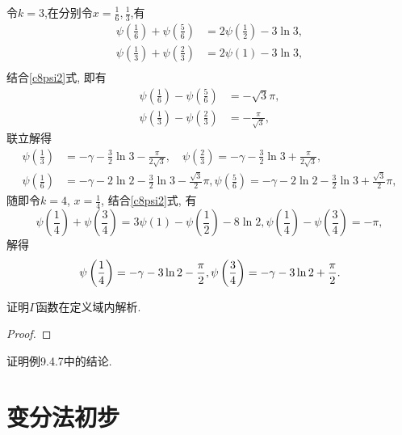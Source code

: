 \begin{quizb}
\begin{solution}
令\(k=3\),在分别令\(x=\frac{1}{6},\frac{1}{3}\),有\[\begin{split}
\psi\left(\frac{1}{6}\right)+\psi\left(\frac{5}{6}\right)&=2\psi\left(\frac{1}{2}\right)-3\ln 3,\\
\psi\left(\frac{1}{3}\right)+\psi\left(\frac{2}{3}\right)&=2\psi\left(1\right)-3\ln 3,\\
\end{split}\]结合\eqref{c8psi2}式, 即有\[\begin{split}
\psi\left(\frac{1}{6}\right)-\psi\left(\frac{5}{6}\right)&=-\sqrt{3}\pi,\\
\psi\left(\frac{1}{3}\right)-\psi\left(\frac{2}{3}\right)&=-\frac{\pi}{\sqrt{3}},
\end{split}\]联立解得\[
\begin{split}
\psi\left(\frac{1}{3}\right)&=-\gamma-\frac{3}{2}\ln 3-\frac{\pi}{2\sqrt{3}},\quad \psi\left(\frac{2}{3}\right)=-\gamma-\frac{3}{2}\ln 3+\frac{\pi}{2\sqrt{3}},\\
\psi\left(\frac{1}{6}\right)&=-\gamma-2\ln2-\frac{3}{2}\ln 3-\frac{\sqrt{3}}{2}\pi,\psi\left(\frac{5}{6}\right)=-\gamma-2\ln2-\frac{3}{2}\ln 3+\frac{\sqrt{3}}{2}\pi,
\end{split}\]
随即令\(k=4\), \(x=\frac{1}{4}\), 结合\eqref{c8psi2}式, 有\[\psi\left(\frac{1}{4}\right)+\psi\left(\frac{3}{4}\right)=3\psi(1)-\psi\left(\frac{1}{2}\right)-8\ln 2,
\psi\left(\frac{1}{4}\right)-\psi\left(\frac{3}{4}\right)=-\pi,\]解得\[\psi\left(\frac{1}{4}\right)=-\gamma-3\ln 2-\frac{\pi}{2},\psi\left(\frac{3}{4}\right)=-\gamma-3\ln 2+\frac{\pi}{2}.\qedhere\]
\end{solution}
\woe 证明\(\Gamma\)函数在定义域内解析.
\begin{proof}
	
\end{proof}
\woe 证明例9.4.7中的结论.
\end{quizb}

\section{变分法初步}

